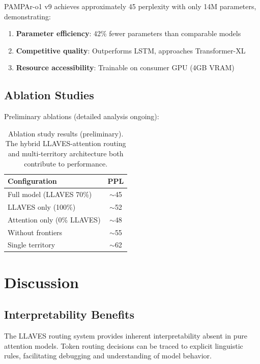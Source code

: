 \documentclass[11pt,a4paper]{article}
\begin{document}
PAMPAr-o1 v9 achieves approximately 45 perplexity with only 14M parameters, demonstrating:

\begin{enumerate}
    \item \textbf{Parameter efficiency}: 42\% fewer parameters than comparable models
    \item \textbf{Competitive quality}: Outperforms LSTM, approaches Transformer-XL
    \item \textbf{Resource accessibility}: Trainable on consumer GPU (4GB VRAM)
\end{enumerate}

\subsection{Ablation Studies}

Preliminary ablations (detailed analysis ongoing):

\begin{table}[h]
\centering
\begin{tabular}{lc}
\toprule
\textbf{Configuration} & \textbf{PPL} \\
\midrule
Full model (LLAVES 70\%) & $\sim$45 \\
LLAVES only (100\%) & $\sim$52 \\
Attention only (0\% LLAVES) & $\sim$48 \\
Without frontiers & $\sim$55 \\
Single territory & $\sim$62 \\
\bottomrule
\end{tabular}
\caption{Ablation study results (preliminary). The hybrid LLAVES-attention routing and multi-territory architecture both contribute to performance.}
\label{tab:ablation}
\end{table}

\section{Discussion}
\label{sec:discussion}

\subsection{Interpretability Benefits}

The LLAVES routing system provides inherent interpretability absent in pure attention models. Token routing decisions can be traced to explicit linguistic rules, facilitating debugging and understanding of model behavior.
\end{document}

